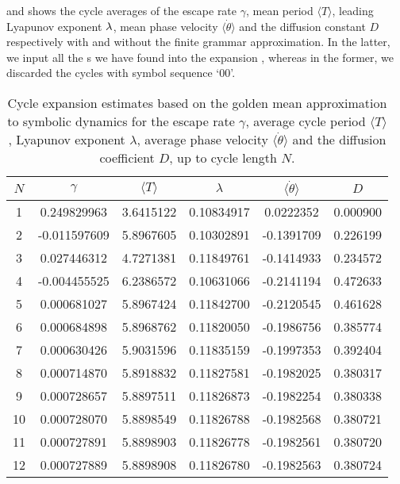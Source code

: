 \documentclass[aip,cha,
reprint,
secnumarabic,
nofootinbib, tightenlines,
nobibnotes, showkeys, showpacs,
superscriptaddress,
]{revtex4-1}
\begin{document}
{ and  shows
the cycle averages of the escape rate $\gamma$, mean period
$\langle T \rangle$, leading Lyapunov exponent $\lambda$, mean phase velocity
$\langle \dot{\theta} \rangle$ and the diffusion constant $D$ respectively
with and without the finite grammar approximation. In the latter, we input
all the \rpo s we have found into the expansion
, whereas in the former, we discarded the
cycles with symbol sequence `00'.

\begin{table}
	\begin{tabular}{c|c|c|c|c|c}
	 $N$ & $\gamma$ & $\langle T \rangle$ & $\lambda$ & $\langle \dot{\theta} \rangle$ & $D$ \\
	\hline
	1 & 0.249829963 & 3.6415122 & 0.10834917 & 0.0222352 & 0.000900 \\
 	2 & -0.011597609 & 5.8967605 & 0.10302891 & -0.1391709 & 0.226199 \\
 	3 & 0.027446312 & 4.7271381 & 0.11849761 & -0.1414933 & 0.234572 \\
 	4 & -0.004455525 & 6.2386572 & 0.10631066 & -0.2141194 & 0.472633 \\
 	5 & 0.000681027 & 5.8967424 & 0.11842700 & -0.2120545 & 0.461628 \\
 	6 & 0.000684898 & 5.8968762 & 0.11820050 & -0.1986756 & 0.385774 \\
 	7 & 0.000630426 & 5.9031596 & 0.11835159 & -0.1997353 & 0.392404 \\
 	8 & 0.000714870 & 5.8918832 & 0.11827581 & -0.1982025 & 0.380317 \\
 	9 & 0.000728657 & 5.8897511 & 0.11826873 & -0.1982254 & 0.380338 \\
 	10 & 0.000728070 & 5.8898549 & 0.11826788 & -0.1982568 & 0.380721 \\
 	11 & 0.000727891 & 5.8898903 & 0.11826778 & -0.1982561 & 0.380720 \\
 	12 & 0.000727889 & 5.8898908 & 0.11826780 & -0.1982563 & 0.380724 \\
 	\end{tabular}
	\caption{Cycle expansion estimates based on the golden mean approximation
              to symbolic dynamics for
             the escape rate $\gamma$, average cycle period $\langle T \rangle$,
             Lyapunov exponent $\lambda$, average phase velocity
             $\langle \dot{\theta} \rangle$ and the diffusion coefficient $D$,
             up to cycle length $N$.}
	\label{t-DynamicalAverages}
\end{table}

}
\end{document}
